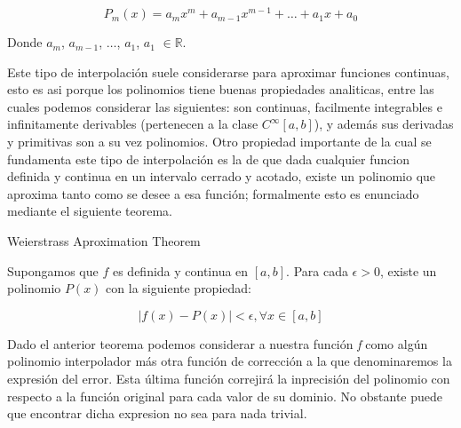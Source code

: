 \begin{equation}
	 P_m(x) = a_mx^m + a_{m-1}x^{m-1} + \dots + a_1x + a_0
\end{equation}

Donde $a_m$, $a_{m-1}$, $\dots$, $a_1$, $a_1$ $\in \mathbb{R}$.

Este tipo de interpolación suele considerarse para aproximar funciones continuas, esto es asi porque los polinomios tiene buenas propiedades analiticas, entre las cuales podemos considerar las siguientes: son continuas, facilmente integrables e infinitamente derivables (pertenecen a la clase $C^{\infty}[a, b]$), y además sus derivadas y primitivas son a su vez polinomios. Otro propiedad importante de la cual se fundamenta este tipo de interpolación es la de que dada cualquier funcion definida y continua en un intervalo cerrado y acotado, existe un polinomio que aproxima tanto como se desee a esa función; formalmente esto es enunciado mediante el siguiente teorema.


\begin{theorem}
	\item Weierstrass Aproximation Theorem
	\item Supongamos que $f$ es definida y continua en $[a, b]$. Para cada $\epsilon > 0$, existe un polinomio $P(x)$ con la siguiente propiedad:	
\end{theorem}
\begin{equation}
	 |f(x) - P(x)| < \epsilon, \forall x \in [a, b]
\end{equation}

\vspace{2mm}
 Dado el anterior teorema podemos considerar a nuestra función \textit{f} como algún polinomio interpolador más otra función de corrección a la que denominaremos la expresión del error. Esta última función correjirá la inprecisión del polinomio con respecto a la función original para cada valor de su dominio. No obstante puede que encontrar dicha expresion no sea para nada trivial.

